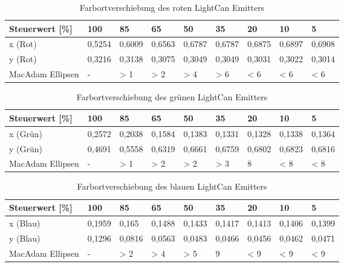 \documentclass[11pt]{scrartcl}
\begin{document}
\noindent
\begin{table}[H]
    \begin{tabularx}{\textwidth}{|l|X|X|X|X|X|X|X|X|}
        \hline
        Steuerwert [\%]  & 100    & 85     & 65     & 50     & 35     & 20     & 10     & 5      \\\hline
        x (Rot)          & 0,5254 & 0,6009 & 0,6563 & 0,6787 & 0,6787 & 0,6875 & 0,6897 & 0,6908 \\\hline
        y (Rot)          & 0,3216 & 0,3138 & 0,3075 & 0,3049 & 0,3049 & 0,3031 & 0,3022 & 0,3014 \\\hline
        MacAdam Ellipsen & -      & > 1    & > 2    & > 4    & > 6    & < 6    & < 6    & < 6    \\\hline
    \end{tabularx}
    \caption{Farbortverschiebung des roten LightCan Emitters}
\end{table}
\noindent
\begin{table}[H]
    \begin{tabularx}{\textwidth}{|l|X|X|X|X|X|X|X|X|}
        \hline
        Steuerwert [\%]  & 100    & 85     & 65     & 50     & 35     & 20     & 10     & 5      \\\hline
        x (Grün)         & 0,2572 & 0,2038 & 0,1584 & 0,1383 & 0,1331 & 0,1328 & 0,1338 & 0,1364 \\\hline
        y (Grün)         & 0,4691 & 0,5558 & 0,6319 & 0,6661 & 0,6759 & 0,6802 & 0,6823 & 0,6816 \\\hline
        MacAdam Ellipsen & -      & > 1    & > 2    & > 2    & > 3    & 8      & < 8    & < 8    \\\hline
    \end{tabularx}
    \caption{Farbortverschiebung des grünen LightCan Emitters}
\end{table}
\noindent
\begin{table}[H]
    \begin{tabularx}{\textwidth}{|l|X|X|X|X|X|X|X|X|}
        \hline
        Steuerwert [\%]  & 100    & 85     & 65     & 50     & 35     & 20     & 10     & 5      \\\hline
        x (Blau)         & 0,1959 & 0,165  & 0,1488 & 0,1433 & 0,1417 & 0,1413 & 0,1406 & 0,1399 \\\hline
        y (Blau)         & 0,1296 & 0,0816 & 0,0563 & 0,0483 & 0,0466 & 0,0456 & 0,0462 & 0,0471 \\\hline
        MacAdam Ellipsen & -      & > 2    & > 4    & > 5    & 9      & < 9    & < 9    & < 9    \\\hline
    \end{tabularx}
    \caption{Farbortverschiebung des blauen LightCan Emitters}
\end{table}
\end{document}

